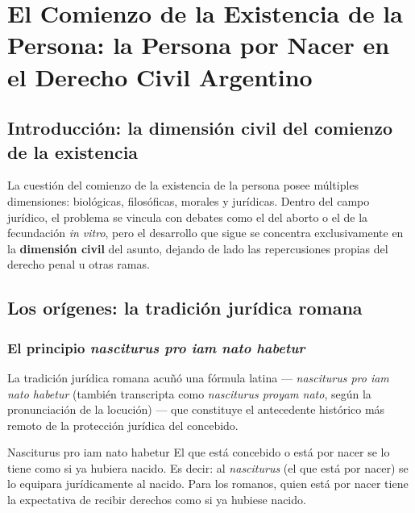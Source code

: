 \documentclass[12pt,oneside]{book}
\begin{document}
\tableofcontents


\chapter{El Comienzo de la Existencia de la Persona: la Persona por Nacer en el Derecho Civil Argentino}

\section{Introducción: la dimensión civil del comienzo de la existencia}

La cuestión del comienzo de la existencia de la persona posee múltiples dimensiones: biológicas, filosóficas, morales y jurídicas. Dentro del campo jurídico, el problema se vincula con debates como el del aborto o el de la fecundación \textit{in vitro}, pero el desarrollo que sigue se concentra exclusivamente en la \textbf{dimensión civil} del asunto, dejando de lado las repercusiones propias del derecho penal u otras ramas.

\section{Los orígenes: la tradición jurídica romana}

\subsection{El principio \textit{nasciturus pro iam nato habetur}}

La tradición jurídica romana acuñó una fórmula latina --- \textit{nasciturus pro iam nato habetur} (también transcripta como \textit{nasciturus proyam nato}, según la pronunciación de la locución) --- que constituye el antecedente histórico más remoto de la protección jurídica del concebido.

\begin{definition}{Nasciturus pro iam nato habetur}
El que está concebido o está por nacer se lo tiene como si ya hubiera nacido. Es decir: al \textit{nasciturus} (el que está por nacer) se lo equipara jurídicamente al nacido. Para los romanos, quien está por nacer tiene la expectativa de recibir derechos como si ya hubiese nacido.
\end{definition}
\end{document}

